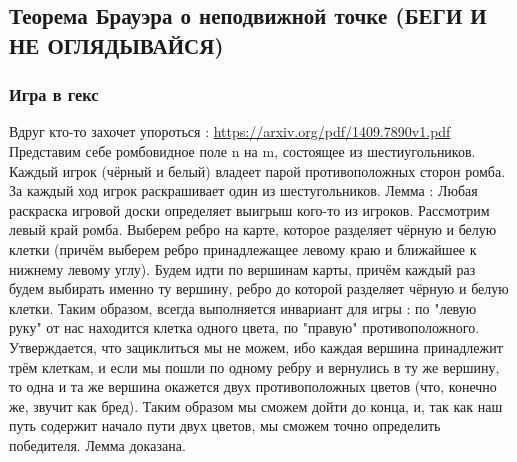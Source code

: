 \documentclass[12pt, a4paper]{article}
\newcommand{\nl}{\newline}
\begin{document}
    \subsection{Теорема Брауэра о неподвижной точке (БЕГИ И НЕ ОГЛЯДЫВАЙСЯ)}
        \subsubsection{Игра в гекс}
        Вдруг кто-то захочет упороться : \url{https://arxiv.org/pdf/1409.7890v1.pdf} \nl
        Представим себе ромбовидное поле n на m, состоящее из шестиугольников. Каждый игрок (чёрный и белый) владеет парой противоположных сторон ромба. За каждый ход игрок раскрашивает один из шестугольников. \nl
        Лемма : Любая раскраска игровой доски определяет выигрыш кого-то из игроков. \nl
        Рассмотрим левый край ромба. Выберем ребро на карте, которое разделяет чёрную и белую клетки (причём выберем ребро принадлежащее левому краю и ближайшее к нижнему левому углу). Будем идти по вершинам карты, причём каждый раз будем выбирать именно ту вершину, ребро до которой разделяет чёрную и белую клетки. Таким образом, всегда выполняется инвариант для игры : по "левую руку" от нас находится клетка одного цвета, по "правую" противоположного. Утверждается, что зациклиться мы не можем, ибо каждая вершина принадлежит трём клеткам, и если мы пошли по одному ребру и вернулись в ту же вершину, то одна и та же вершина окажется двух противоположных цветов (что, конечно же, звучит как бред). Таким образом мы сможем дойти до конца, и, так как наш путь содержит начало пути двух цветов, мы сможем точно определить победителя. Лемма доказана. \nl
        
\end{document}
